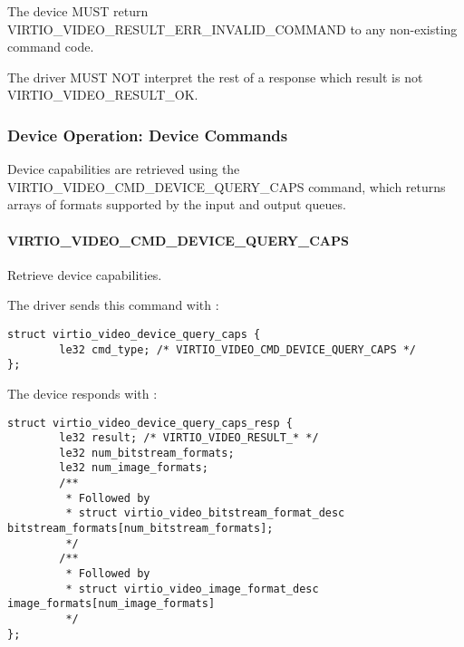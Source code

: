 
The device MUST return VIRTIO\_VIDEO\_RESULT\_ERR\_INVALID\_COMMAND to
any non-existing command code.


The driver MUST NOT interpret the rest of a response which result is not
VIRTIO\_VIDEO\_RESULT\_OK.

\subsubsection{Device Operation: Device Commands}\label{sec:Device Types / Video Device / Device Operation / Device Operation: Device Commands}

Device capabilities are retrieved using the
VIRTIO\_VIDEO\_CMD\_DEVICE\_QUERY\_CAPS command, which returns arrays of
formats supported by the input and output queues.

\paragraph{VIRTIO_VIDEO_CMD_DEVICE_QUERY_CAPS}\label{sec:Device Types / Video Device / Device Operation / Device Operation: Device Commands / VIRTIO_VIDEO_CMD_DEVICE_QUERY_CAPS}

Retrieve device capabilities.

The driver sends this command with
:

\begin{lstlisting}
struct virtio_video_device_query_caps {
        le32 cmd_type; /* VIRTIO_VIDEO_CMD_DEVICE_QUERY_CAPS */
};
\end{lstlisting}

The device responds with
:

\begin{lstlisting}
struct virtio_video_device_query_caps_resp {
        le32 result; /* VIRTIO_VIDEO_RESULT_* */
        le32 num_bitstream_formats;
        le32 num_image_formats;
        /**
         * Followed by
         * struct virtio_video_bitstream_format_desc bitstream_formats[num_bitstream_formats];
         */
        /**
         * Followed by
         * struct virtio_video_image_format_desc image_formats[num_image_formats]
         */
};
\end{lstlisting}

